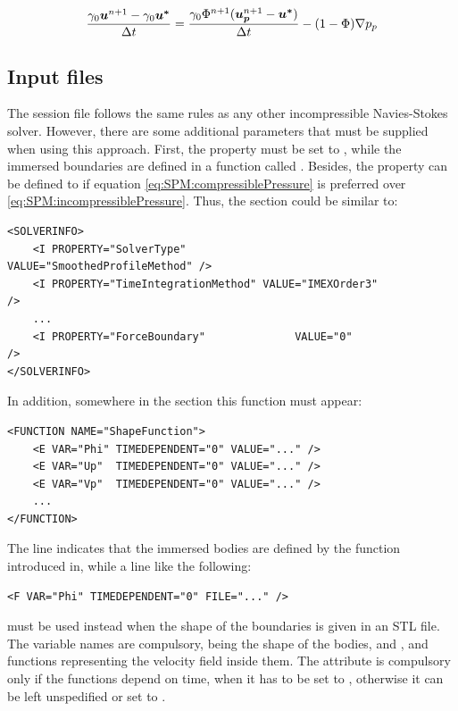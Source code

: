 \begin{equation} \label{eq:SPM:compressiblePressure}
    \frac{\gamma_0\boldsymbol{u}^{n+1}-\gamma_0\boldsymbol{u^*}}{\Delta t} = \frac{\gamma_0\Phi^{n+1}(\boldsymbol{u_p}^{n+1}-\boldsymbol{u^*})}{\Delta t} -(1-\Phi) \nabla p_p
\end{equation}

\subsection{Input files}

The session file follows the same rules as any other incompressible Navies-Stokes solver. However, there are some additional parameters that must be supplied when using this approach. First, the property  must be set to , while the immersed boundaries are defined in a function called . Besides, the property  can be defined to  if equation \eqref{eq:SPM:compressiblePressure} is preferred over \eqref{eq:SPM:incompressiblePressure}. Thus, the  section could be similar to:

\begin{lstlisting}[style=XMLStyle]
<SOLVERINFO>
    <I PROPERTY="SolverType"                    VALUE="SmoothedProfileMethod" />
    <I PROPERTY="TimeIntegrationMethod" VALUE="IMEXOrder3"                   />
    ...
    <I PROPERTY="ForceBoundary"              VALUE="0"                                    />
</SOLVERINFO>
\end{lstlisting}

In addition, somewhere in the  section this function must appear:

\begin{lstlisting}[style=XMLStyle]
<FUNCTION NAME="ShapeFunction">
    <E VAR="Phi" TIMEDEPENDENT="0" VALUE="..." />
    <E VAR="Up"  TIMEDEPENDENT="0" VALUE="..." />
    <E VAR="Vp"  TIMEDEPENDENT="0" VALUE="..." />
    ...
</FUNCTION>
\end{lstlisting}

The line  indicates that the immersed bodies are defined by the function introduced in, while a line like the following:

\begin{lstlisting}[style=XMLStyle]
    <F VAR="Phi" TIMEDEPENDENT="0" FILE="..." />
\end{lstlisting}

must be used instead when the shape of the boundaries is given in an STL file. The variable names are compulsory, being  the shape of the bodies, and ,  and  functions representing the velocity field inside them. The attribute  is compulsory only if the functions depend on time, when it has to be set to , otherwise it can be left unspedified or set to .